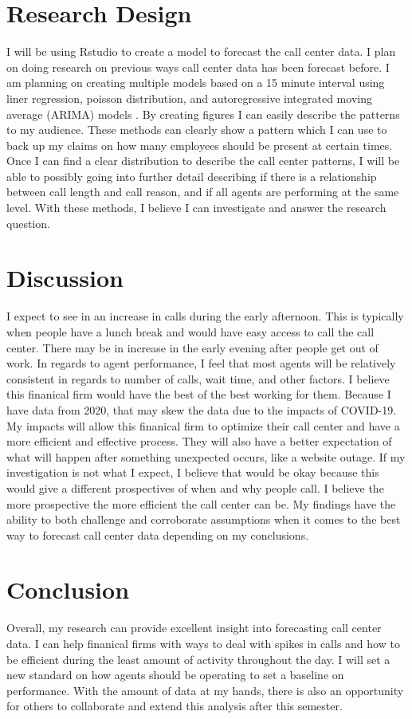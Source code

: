 \documentclass[12pt]{article}
\begin{document}
\section*{Research Design}
I will be using Rstudio to create a model to forecast the call center data. I plan on doing research on previous ways call center data
has been forecast before. I am planning on creating multiple models based on a 15 minute interval using liner regression, poisson distribution,
and autoregressive integrated moving average (ARIMA) models \citep*{ibrahim2016modeling}. By creating figures I can
easily describe the patterns to my audience. These methods can clearly show a pattern which I can use to back up my claims on how many 
employees should be present at certain times. Once I can find a clear distribution to describe the call center patterns, I will be
able to possibly going into further detail describing if there is a relationship between call length and call reason, and if all agents are
performing at the same level. With these methods, I believe I can investigate and answer the research question. 

\section*{Discussion}
I expect to see in an increase in calls during the early afternoon. This is typically when people have a lunch break and would have 
easy access to call the call center. There may be in increase in the early evening after people get out of work. In regards to agent
performance, I feel that most agents will be relatively consistent in regards to number of calls, wait time, and other factors. I believe 
this finanical firm would have the best of the best working for them. Because I have data from 2020, that may skew the data due to the impacts
of COVID-19. My impacts will allow this finanical firm to optimize their call center and have a more efficient and effective process. They will
also have a better expectation of what will happen after something unexpected occurs, like a website outage. If my investigation is not what I 
expect, I believe that would be okay because this would give a different prospectives of when and why people call. I believe the more prospective
the more efficient the call center can be. My findings have the ability to both challenge and corroborate assumptions when it comes to the best way to 
forecast call center data depending on my conclusions.


\section*{Conclusion}
Overall, my research can provide excellent insight into forecasting call center data. I can help finanical firms with ways to deal with spikes in 
calls and how to be efficient during the least amount of activity throughout the day. I will set a new standard on how agents should be operating to set
a baseline on performance. With the amount of data at my hands, there is also an opportunity for others to collaborate and extend this analysis after this semester.


\end{document}
